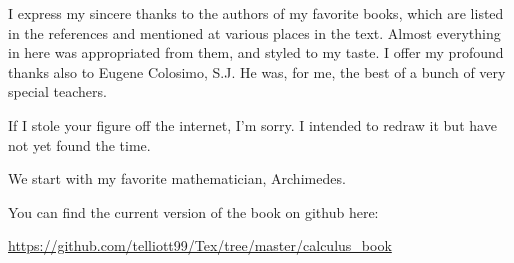 \documentclass[11pt, oneside]{article}
\begin{document}
I express my sincere thanks to the authors of my favorite books, which are listed in the references and mentioned at various places in the text.  Almost everything in here was appropriated from them, and styled to my taste.  I offer my profound thanks also to Eugene Colosimo, S.J.  He was, for me, the best of a bunch of very special teachers.

If I stole your figure off the internet, I'm sorry.  I intended to redraw it but have not yet found the time.  

We start with my favorite mathematician, Archimedes.

You can find the current version of the book on github here:

\url{https://github.com/telliott99/Tex/tree/master/calculus_book}
\end{document}

